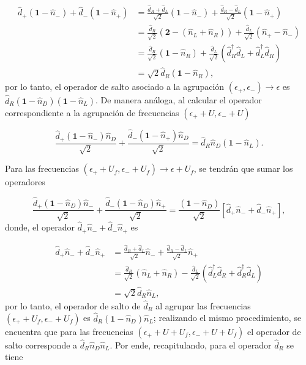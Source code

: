 \begin{appendixs}
\begin{align*}
    \hat{d}_{+}(\textbf{1}-\hat{n}_{-}) + \hat{d}_{-}(\textbf{1}-\hat{n}_{+}) & =  \frac{\hat{d}_{R} + \hat{d}_{L}}{\sqrt{2}}(\textbf{1} - \hat{n}_{-}) + \frac{\hat{d}_{R} - \hat{d}_{L}}{\sqrt{2}}(\textbf{1} - \hat{n}_{+})   \\
    & = \frac{\hat{d}_{R}}{\sqrt{2}}(\textbf{2} - (\hat{n}_{L} + \hat{n}_{R})) + \frac{\hat{d}_{L}}{\sqrt{2}} (\hat{n}_{+}-\hat{n}_{-}) \\
    & = \frac{\hat{d}_{R}}{\sqrt{2}}(\textbf{1} -  \hat{n}_{R}) + \frac{\hat{d}_{L}}{\sqrt{2}} (\hat{d}^{\dagger}_{R}\hat{d}_{L} + \hat{d}^{\dagger}_{L}\hat{d}_{R}) \\
    & = \sqrt{2}\hat{d}_{R}(\textbf{1}-\hat{n}_{R}),
\end{align*}
por lo tanto, el operador de salto asociado a la agrupación $(\epsilon_{+},\epsilon_{-}) \to \epsilon$ es $\hat{d}_{R}(\textbf{1} - \hat{n}_{D})(\textbf{1} - \hat{n}_{L})$. De manera análoga, al calcular el operador correspondiente a la agrupación de frecuencias $(\epsilon_{+}+U, \epsilon_{-}+U)$

\begin{equation*}
    \frac{\hat{d}_{+}(\textbf{1}-\hat{n}_{-})\hat{n}_{D}}{\sqrt{2}} + \frac{\hat{d}_{-}(\textbf{1}-\hat{n}_{+})\hat{n}_{D}}{\sqrt{2}}  = \hat{d}_{R}\hat{n}_{D}(\textbf{1}-\hat{n}_{L}).
\end{equation*}

Para las frecuencias $(\epsilon_{+}+U_{f},\epsilon_{-}+U_{f})\to \epsilon + U_{f}$, se tendrán que sumar los operadores 

\begin{equation*}
    \frac{\hat{d}_{+}(\textbf{1}-\hat{n}_{D})\hat{n}_{-} }{\sqrt{2}} + \frac{\hat{d}_{-}(\textbf{1}-\hat{n}_{D})\hat{n}_{+} }{\sqrt{2}} = \frac{(\textbf{1}-\hat{n}_{D})}{\sqrt{2}} [\hat{d}_{+}\hat{n}_{-} + \hat{d}_{-}\hat{n}_{+}],
\end{equation*}
donde, el operador $\hat{d}_{+}\hat{n}_{-} + \hat{d}_{-}\hat{n}_{+}$ es 

\begin{align*}
    \hat{d}_{+}\hat{n}_{-} + \hat{d}_{-}\hat{n}_{+} & = \frac{\hat{d}_{R}+\hat{d}_{L}}{\sqrt{2}}\hat{n}_{-} + \frac{\hat{d}_{R}-\hat{d}_{L}}{\sqrt{2}}\hat{n}_{+}  \\
    & = \frac{\hat{d}_{R}}{\sqrt{2}}(\hat{n}_{L}+\hat{n}_{R}) - \frac{\hat{d}_{L}}{\sqrt{2}}(\hat{d}^{\dagger}_{L}\hat{d}_{R}+\hat{d}^{\dagger}_{R}\hat{d}_{L}) \\
    & = \sqrt{2}\hat{d}_{R}\hat{n}_{L},
\end{align*}
por lo tanto, el operador de salto de $\hat{d}_{R}$ al agrupar las frecuencias $(\epsilon_{+}+U_{f}, \epsilon_{-}+U_{f})$ es $\hat{d}_{R}(\textbf{1} - \hat{n}_{D})\hat{n}_{L}$; realizando el mismo procedimiento, se encuentra que para las frecuencias $(\epsilon_{+}+U+U_{f}, \epsilon_{-}+U+U_{f})$ el operador de salto corresponde a $\hat{d}_{R}\hat{n}_{D}\hat{n}_{L}$. Por ende, recapitulando, para el operador $\hat{d}_{R}$ se tiene


\end{appendixs}
